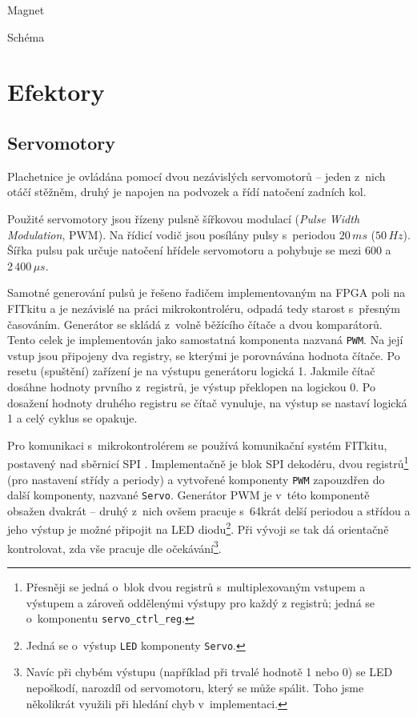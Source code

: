 Magnet

Schéma
\section{Efektory}

\subsection{Servomotory}
Plachetnice je ovládána pomocí dvou nezávislých servomotorů -- jeden z~nich
otáčí stěžněm, druhý je napojen na podvozek a řídí natočení zadních kol.

Použité servomotory jsou řízeny pulsně šířkovou modulací (\emph{Pulse Width
Modulation}, PWM). Na řídicí vodič jsou posílány pulsy s~periodou $20\,ms$
($50\,Hz$). Šířka pulsu pak určuje natočení hřídele servomotoru a pohybuje se
mezi $600$ a $2\,400\,\mu{}s$. \cite{modelarska_stranka_dohledam_doma}

Samotné generování pulsů je řešeno řadičem implementovaným na FPGA poli na
FITkitu a je nezávislé na práci mikrokontroléru, odpadá tedy starost s~přesným
časováním. Generátor se skládá z~volně běžícího čítače a dvou komparátorů. Tento
celek je implementován jako samostatná komponenta nazvaná \texttt{PWM}. Na její
vstup jsou připojeny dva registry, se kterými je porovnávána hodnota čítače. Po
resetu (spuštění) zařízení je na výstupu generátoru logická 1. Jakmile čítač
dosáhne hodnoty prvního z~registrů, je výstup překlopen na logickou 0. Po
dosažení hodnoty druhého registru se čítač vynuluje, na výstup se nastaví
logická 1 a celý cyklus se opakuje.

Pro komunikaci s~mikrokontrolérem se používá komunikační systém FITkitu,
postavený nad sběrnicí SPI \cite{fitkit_communication}. Implementačně je blok SPI
dekodéru, dvou registrů\footnote{Přesněji se jedná o~blok dvou registrů
s~multiplexovaným vstupem a výstupem a zároveň oddělenými výstupy pro každý z
registrů; jedná se o~komponentu \texttt{servo\_ctrl\_reg}.} (pro nastavení střídy
a periody) a vytvořené komponenty \texttt{PWM} zapouzdřen do další komponenty,
nazvané \texttt{Servo}. Generátor PWM je v~této komponentě obsažen dvakrát --
druhý z~nich ovšem pracuje s~64krát delší periodou a střídou a jeho
výstup je možné připojit na LED diodu\footnote{Jedná se o~výstup \texttt{LED}
komponenty \texttt{Servo}.}. Při vývoji se tak dá orientačně kontrolovat, zda
vše pracuje dle očekávání\footnote{Navíc při chybém výstupu (například při
trvalé hodnotě 1 nebo 0) se LED nepoškodí, narozdíl od servomotoru, který se
může spálit. Toho jsme několikrát využili při hledání chyb v~implementaci.}.

